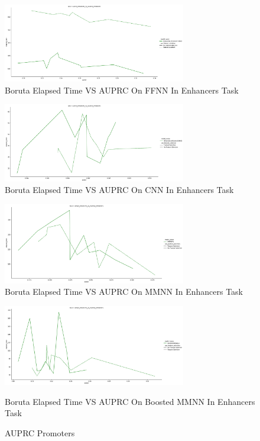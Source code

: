 \documentclass{article}
\begin{document}
\begin{enumerate}
    \begin{figure}[!ht]
        \centering
        \includegraphics[width=8cm]{image/boruta/enhancers/BinaryClassificationFFNNV1.PNG}
        \caption{Boruta Elapsed Time VS AUPRC On FFNN In Enhancers Task}
        \label{fig:Boruta_enhancers_BinaryClassificationFFNNV1}
    \end{figure}
    \begin{figure}[!ht]
        \centering
        \includegraphics[width=8cm]{image/boruta/enhancers/BinaryClassificationCNNV1.PNG}
        \caption{Boruta Elapsed Time VS AUPRC On CNN In Enhancers Task}
        \label{fig:Boruta_enhancers_BinaryClassificationCNNV1}
    \end{figure}
    \begin{figure}[!ht]
        \centering
        \includegraphics[width=8cm]{image/boruta/enhancers/MMNNV1.PNG}
        \caption{Boruta Elapsed Time VS AUPRC On MMNN In Enhancers Task}
        \label{fig:Boruta_enhancers_MMNNV1}
    \end{figure}
    \begin{figure}[!ht]
        \centering
        \includegraphics[width=8cm]{image/boruta/enhancers/BoostedMMNNV1.PNG}
        \caption{Boruta Elapsed Time VS AUPRC On Boosted MMNN In Enhancers Task}
        \caption{AUPRC Promoters}
        \label{fig:Boruta_enhancers_BoostedMMNNV1}
    \end{figure}
    

\end{enumerate}
\end{document}
